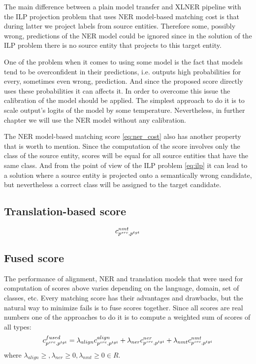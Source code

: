 The main difference between a plain model transfer and XLNER pipeline with the ILP projection problem that uses NER model-based
matching cost is that during latter we project labels from source entities. Therefore some, possibly wrong, predictions of the
NER model could be ignored since in the solution of the ILP problem there is no source entity that projects
to this target entity.

One of the problem when it comes to using some model is the fact that models tend to be overconfident in their
predictions, i.e. outputs high probabilities for every, sometimes even wrong, prediction. And since the
proposed score directly uses these probabilities it can affects it. In order to overcome this issue the
calibration of the model should be applied. The simplest approach to do it is to scale output's logits of the
model by some temperature. Nevertheless, in further chapter we will use the NER model without any calibration.

The NER model-based matching score \eqref{eq:ner_cost} also has another property that is worth to mention.
Since the computation of the score involves only the class of the source entity, scores will be equal
for all source entities that have the same class. And from the point of view of the ILP problem
\eqref{eq:ilp} it can lead to a solution where a source entity is projected onto a semantically wrong candidate, but
nevertheless a correct class will be assigned to the target candidate.

\subsection{Translation-based score}

\begin{equation} \label{eq:nmt_cost}
  c_{p^{src}, p^{tgt}}^{nmt}
\end{equation}

\subsection{Fused score}
The performance of alignment, NER and translation models that were used for computation of
scores above varies depending on the language, domain, set of classes, etc.
Every matching score has their advantages and drawbacks, but the natural way to minimize fails is
to fuse scores together. Since all scores are real numbers one of the approaches to do it is to compute a
weighted sum of scores of all types:
\begin{equation} \label{eq:fused_cost}
  c_{p^{src}, p^{tgt}}^{fused} =
  \lambda_{align} c_{p^{src}, p^{tgt}}^{align} +
  \lambda_{ner} c_{p^{src}, p^{tgt}}^{ner} +
  \lambda_{nmt} c_{p^{src}, p^{tgt}}^{nmt}
\end{equation}
where \( \lambda_{align} \geq, \lambda_{ner} \geq 0, \lambda_{nmt} \geq 0 \in R\).


